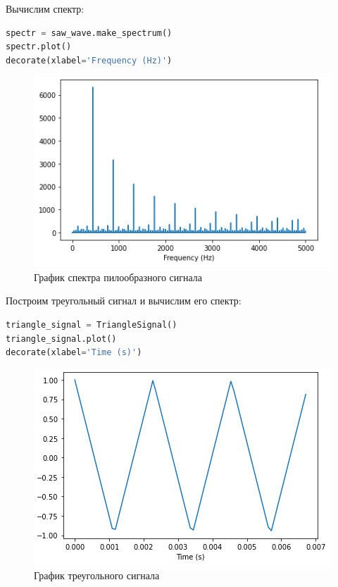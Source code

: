 Вычислим спектр:

\begin{lstlisting}[language=Python]
spectr = saw_wave.make_spectrum()
spectr.plot()
decorate(xlabel='Frequency (Hz)')
\end{lstlisting}

\begin{figure}[H]
	\begin{center}
		\includegraphics[scale=1]{fig/lab02/lab02_02.png}
		\caption{График спектра пилообразного сигнала}
	\end{center}
\end{figure}

Построим треугольный сигнал и вычислим его спектр:

\begin{lstlisting}[language=Python]
triangle_signal = TriangleSignal()
triangle_signal.plot()
decorate(xlabel='Time (s)')
\end{lstlisting}

\begin{figure}[H]
	\begin{center}
		\includegraphics[scale=1]{fig/lab02/lab02_03.png}
		\caption{График треугольного сигнала}
	\end{center}
\end{figure}

